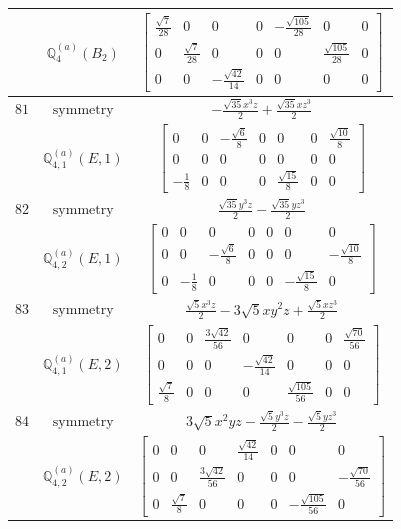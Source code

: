 \documentclass[fleqn,8pt,landscape]{jsarticle}
\begin{document}
\begin{longtable}{ccc}
$  $ & $ \mathbb{Q}_{4}^{(a)}(B_{2}) $ & $ \begin{bmatrix} \frac{\sqrt{7}}{28} & 0 & 0 & 0 & - \frac{\sqrt{105}}{28} & 0 & 0 \\ 0 & \frac{\sqrt{7}}{28} & 0 & 0 & 0 & \frac{\sqrt{105}}{28} & 0 \\ 0 & 0 & - \frac{\sqrt{42}}{14} & 0 & 0 & 0 & 0 \end{bmatrix} $ \\ \hline
$ 81 $ & $ \text{symmetry} $ & $ - \frac{\sqrt{35} x^{3} z}{2} + \frac{\sqrt{35} x z^{3}}{2} $ \\
$  $ & $ \mathbb{Q}_{4,1}^{(a)}(E,1) $ & $ \begin{bmatrix} 0 & 0 & - \frac{\sqrt{6}}{8} & 0 & 0 & 0 & \frac{\sqrt{10}}{8} \\ 0 & 0 & 0 & 0 & 0 & 0 & 0 \\ - \frac{1}{8} & 0 & 0 & 0 & \frac{\sqrt{15}}{8} & 0 & 0 \end{bmatrix} $ \\ \hline
$ 82 $ & $ \text{symmetry} $ & $ \frac{\sqrt{35} y^{3} z}{2} - \frac{\sqrt{35} y z^{3}}{2} $ \\
$  $ & $ \mathbb{Q}_{4,2}^{(a)}(E,1) $ & $ \begin{bmatrix} 0 & 0 & 0 & 0 & 0 & 0 & 0 \\ 0 & 0 & - \frac{\sqrt{6}}{8} & 0 & 0 & 0 & - \frac{\sqrt{10}}{8} \\ 0 & - \frac{1}{8} & 0 & 0 & 0 & - \frac{\sqrt{15}}{8} & 0 \end{bmatrix} $ \\ \hline
$ 83 $ & $ \text{symmetry} $ & $ \frac{\sqrt{5} x^{3} z}{2} - 3 \sqrt{5} x y^{2} z + \frac{\sqrt{5} x z^{3}}{2} $ \\
$  $ & $ \mathbb{Q}_{4,1}^{(a)}(E,2) $ & $ \begin{bmatrix} 0 & 0 & \frac{3 \sqrt{42}}{56} & 0 & 0 & 0 & \frac{\sqrt{70}}{56} \\ 0 & 0 & 0 & - \frac{\sqrt{42}}{14} & 0 & 0 & 0 \\ \frac{\sqrt{7}}{8} & 0 & 0 & 0 & \frac{\sqrt{105}}{56} & 0 & 0 \end{bmatrix} $ \\ \hline
$ 84 $ & $ \text{symmetry} $ & $ 3 \sqrt{5} x^{2} y z - \frac{\sqrt{5} y^{3} z}{2} - \frac{\sqrt{5} y z^{3}}{2} $ \\
$  $ & $ \mathbb{Q}_{4,2}^{(a)}(E,2) $ & $ \begin{bmatrix} 0 & 0 & 0 & \frac{\sqrt{42}}{14} & 0 & 0 & 0 \\ 0 & 0 & \frac{3 \sqrt{42}}{56} & 0 & 0 & 0 & - \frac{\sqrt{70}}{56} \\ 0 & \frac{\sqrt{7}}{8} & 0 & 0 & 0 & - \frac{\sqrt{105}}{56} & 0 \end{bmatrix} $ \\ \hline

\end{longtable}
\end{document}
